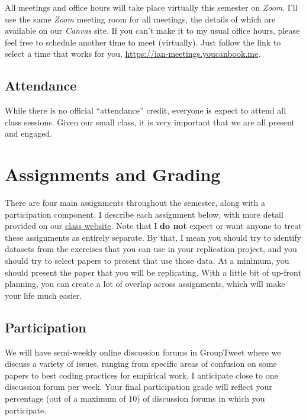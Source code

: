 \documentclass[11pt,]{article}
\begin{document}
All meetings and office hours will take place virtually this semester on
\emph{Zoom}. I'll use the same \emph{Zoom} meeting room for all
meetings, the details of which are available on our \emph{Canvas} site.
If you can't make it to my usual office hours, please feel free to
schedule another time to meet (virtually). Just follow the link to
select a time that works for you,
\url{https://ian-meetings.youcanbook.me}.

\hypertarget{attendance}{%
\subsection{Attendance}\label{attendance}}

While there is no official ``attendance'' credit, everyone is expect to
attend all class sessions. Given our small class, it is very important
that we are all present and engaged.

\hypertarget{assignments-and-grading}{%
\section{Assignments and Grading}\label{assignments-and-grading}}

There are four main assignments throughout the semester, along with a
participation component. I describe each assignment below, with more
detail provided on our \href{https://imccart.github.io/Econ-771/}{class
website}. Note that I \textbf{do not} expect or want anyone to treat
these assignments as entirely separate. By that, I mean you should try
to identify datasets from the exercises that you can use in your
replication project, and you should try to select papers to present that
use those data. At a minimum, you should present the paper that you will
be replicating. With a little bit of up-front planning, you can create a
lot of overlap across assignments, which will make your life much
easier.

\hypertarget{participation}{%
\subsection{Participation}\label{participation}}

We will have semi-weekly online discussion forums in GroupTweet where we
discuss a variety of issues, ranging from specific areas of confusion on
some papers to best coding practices for empirical work. I anticipate
close to one discussion forum per week. Your final participation grade
will reflect your percentage (out of a maximum of 10) of discussion
forums in which you participate.
\end{document}
